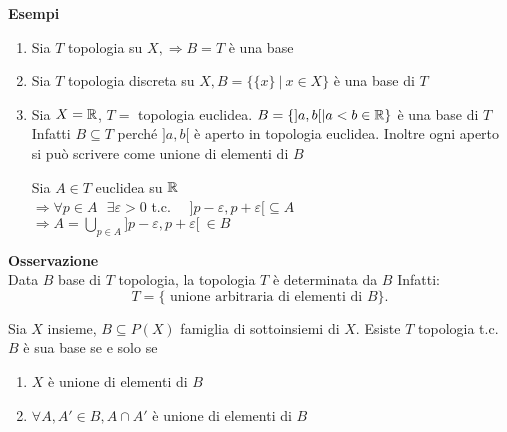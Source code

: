 \documentclass[12px]{article}
\begin{document}
\textbf{Esempi}
\begin{enumerate}
	\item Sia $T$ topologia su $X, \Rightarrow B=T$ è una base
	\item Sia $T$ topologia discreta su $X, B = \{\{x\} \ | \ x\in X\}$  è una base di $T$
	\item Sia  $X = \mathbb{R}$, $T = $ topologia euclidea. $B = \{]a,b[ | a < b \in \mathbb{R}\}$ è una base di  $T$\\
		Infatti  $B\subseteq T$ perché $]a,b[$ è aperto in topologia euclidea. Inoltre ogni aperto si può scrivere come unione di elementi di $B$\\
		 \begin{dimo}
			Sia $A\in T$ euclidea su $\mathbb{R}$\\
			$ \Rightarrow \forall p\in A\ \ \ \exists \varepsilon > 0 $ t.c. \ \ $]p-\varepsilon, p + \varepsilon[ \subseteq A$\\
			$ \Rightarrow A = \bigcup_{p\in A} ]p-\varepsilon, p + \varepsilon[\ \in B$
		\end{dimo}
\end{enumerate}
\textbf{Osservazione}\\
Data $B$ base di $T$ topologia, la topologia $T$ è determinata da $B$ Infatti:
\[
	T = \{\text { unione arbitraria di elementi di } B\}
.\] 
\begin{prop}
	Sia $X$ insieme, $B\subseteq P(X)$ famiglia di sottoinsiemi di  $X$. Esiste $T$ topologia t.c. $B$ è sua base se e solo se
	\begin{enumerate}
		\item $X$ è unione di elementi di $B$
		\item  $\forall A,A'\in B, A\cap A'$ è unione di elementi di $B$
	\end{enumerate}
\end{prop}
\end{document}
